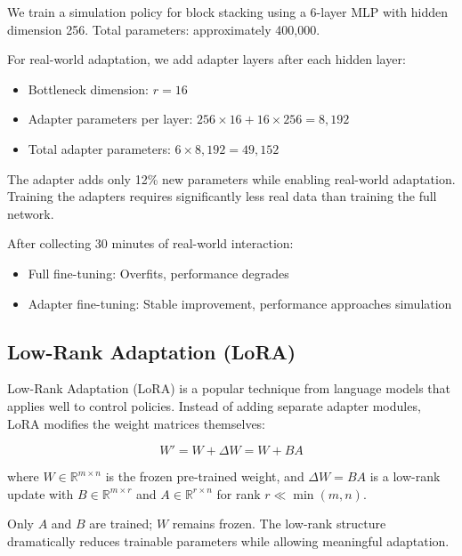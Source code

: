 \begin{example}
\label{ex:adapter_manipulation}
We train a simulation policy for block stacking using a 6-layer MLP with hidden dimension 256. Total parameters: approximately 400,000.

For real-world adaptation, we add adapter layers after each hidden layer:
\begin{itemize}
    \item Bottleneck dimension: $r = 16$
    \item Adapter parameters per layer: $256 \times 16 + 16 \times 256 = 8,192$
    \item Total adapter parameters: $6 \times 8,192 = 49,152$
\end{itemize}

The adapter adds only 12\% new parameters while enabling real-world adaptation. Training the adapters requires significantly less real data than training the full network.

After collecting 30 minutes of real-world interaction:
\begin{itemize}
    \item Full fine-tuning: Overfits, performance degrades
    \item Adapter fine-tuning: Stable improvement, performance approaches simulation
\end{itemize}
\end{example}

\subsection{Low-Rank Adaptation (LoRA)}

Low-Rank Adaptation (LoRA) is a popular technique from language models that applies well to control policies. Instead of adding separate adapter modules, LoRA modifies the weight matrices themselves:

\begin{equation}
W' = W + \Delta W = W + BA
\label{eq:lora}
\end{equation}

where $W \in \mathbb{R}^{m \times n}$ is the frozen pre-trained weight, and $\Delta W = BA$ is a low-rank update with $B \in \mathbb{R}^{m \times r}$ and $A \in \mathbb{R}^{r \times n}$ for rank $r \ll \min(m, n)$.

Only $A$ and $B$ are trained; $W$ remains frozen. The low-rank structure dramatically reduces trainable parameters while allowing meaningful adaptation.

